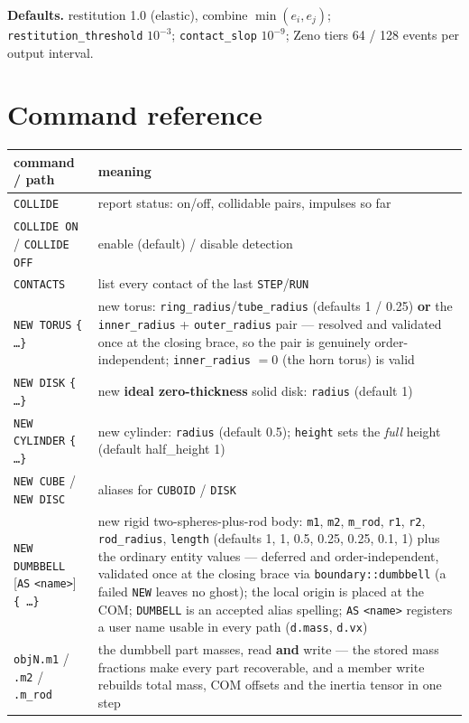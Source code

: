 \documentclass[11pt]{article}
\newcommand{\kw}[1]{\texttt{\uppercase{#1}}}
\newcommand{\code}[1]{\texttt{#1}}
\begin{document}
\textbf{Defaults.} restitution 1.0 (elastic), combine $\min(e_i,e_j)$;
\code{restitution\_threshold} $10^{-3}$; \code{contact\_slop} $10^{-9}$;
Zeno tiers 64 / 128 events per output interval.

\section{Command reference}

\begin{center}
\begin{longtable}{p{5.6cm}p{8.6cm}}
\textbf{command / path} & \textbf{meaning}\\\hline
\kw{collide} & report status: on/off, collidable pairs, impulses so far\\
\kw{collide on} / \kw{collide off} & enable (default) / disable detection\\
\kw{contacts} & list every contact of the last \kw{step}/\kw{run}\\
\kw{new torus} \code{\{ \ldots \}} & new torus: \code{ring\_radius}/\code{tube\_radius} (defaults 1 / 0.25) \textbf{or} the \code{inner\_radius} + \code{outer\_radius} pair --- resolved and validated once at the closing brace, so the pair is genuinely order-independent; \code{inner\_radius} $= 0$ (the horn torus) is valid\\
\kw{new disk} \code{\{ \ldots \}} & new \textbf{ideal zero-thickness} solid disk: \code{radius} (default 1)\\
\kw{new cylinder} \code{\{ \ldots \}} & new cylinder: \code{radius} (default 0.5); \code{height} sets the \emph{full} height (default half\_height 1)\\
\kw{new cube} / \kw{new disc} & aliases for \kw{cuboid} / \kw{disk}\\
\kw{new dumbbell} [\kw{as} \code{<name>}] \code{\{ \ldots \}} & new rigid two-spheres-plus-rod body: \code{m1}, \code{m2}, \code{m\_rod}, \code{r1}, \code{r2}, \code{rod\_radius}, \code{length} (defaults 1, 1, 0.5, 0.25, 0.25, 0.1, 1) plus the ordinary entity values --- deferred and order-independent, validated once at the closing brace via \code{boundary::dumbbell} (a failed \kw{new} leaves no ghost); the local origin is placed at the COM; \kw{dumbell} is an accepted alias spelling; \kw{as} \code{<name>} registers a user name usable in every path (\code{d.mass}, \code{d.vx})\\
\code{objN.m1} / \code{.m2} / \code{.m\_rod} & the dumbbell part masses, read \textbf{and} write --- the stored mass fractions make every part recoverable, and a member write rebuilds total mass, COM offsets and the inertia tensor in one step\\

\end{longtable}
\end{center}
\end{document}
